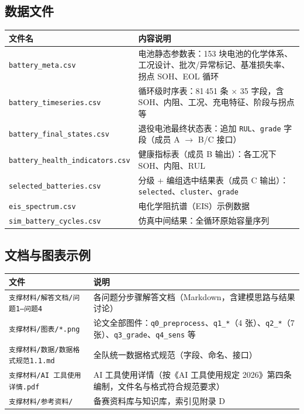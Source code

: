 \documentclass[withoutpreface]{cumcmthesis}
\begin{document}
\begin{appendices}
\subsection{数据文件}
\begin{table}[H]
\centering
\small
\begin{tabularx}{\textwidth}{LL}
\toprule
文件名 & 内容说明 \\
\midrule
\texttt{battery\_meta.csv} & 电池静态参数表：153 块电池的化学体系、工况设计、批次/异常标记、基准损失率、拐点 SOH、EOL 循环 \\
\texttt{battery\_timeseries.csv} & 循环级时序表：81\,451 条 $\times$ 35 字段，含 SOH、内阻、工况、充电特征、阶段与拐点等 \\
\texttt{battery\_final\_states.csv} & 退役电池最终状态表：追加 \texttt{RUL}、\texttt{grade} 字段（成员 A $\to$ B/C 接口） \\
\texttt{battery\_health\_indicators.csv} & 健康指标表（成员 B 输出）：各工况下 SOH、内阻、RUL \\
\texttt{selected\_batteries.csv} & 分级 + 编组选中结果表（成员 C 输出）：\texttt{selected}、\texttt{cluster}、\texttt{grade} \\
\texttt{eis\_spectrum.csv} & 电化学阻抗谱（EIS）示例数据 \\
\texttt{sim\_battery\_cycles.csv} & 仿真中间结果：全循环原始容量序列 \\
\bottomrule
\end{tabularx}
\end{table}

\subsection{文档与图表示例}
\begin{table}[H]
\centering
\small
\begin{tabularx}{\textwidth}{LL}
\toprule
文件 & 说明 \\
\midrule
\texttt{支撑材料/解答文档/问题1--问题4} & 各问题分步骤解答文档（Markdown，含建模思路与结果讨论） \\
\texttt{支撑材料/图表/*.png} & 论文全部图件：\texttt{q0\_preprocess}、\texttt{q1\_*}（4 张）、\texttt{q2\_*}（7 张）、\texttt{q3\_grade}、\texttt{q4\_sens} 等 \\
\texttt{支撑材料/数据/数据格式规范1.1.md} & 全队统一数据格式规范（字段、命名、接口） \\
\texttt{支撑材料/AI 工具使用详情.pdf} & AI 工具使用详情（按《AI 工具使用规定 2026》第四条编制，文件名与格式符合规范要求） \\
\texttt{支撑材料/参考资料/} & 备赛资料库与知识库，索引见附录 D \\
\bottomrule
\end{tabularx}
\end{table}


\end{appendices}
\end{document}
